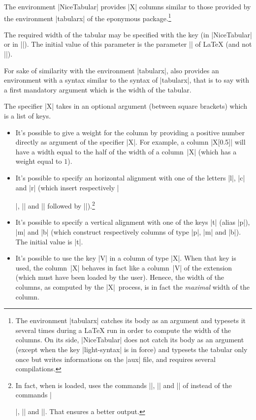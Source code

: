 \documentclass[dvipsnames]{article}
\begin{document}
\label{X-columns}

The environment |{NiceTabular}| provides |X| columns similar to those provided
by the environment |{tabularx}| of the eponymous package.\footnote{The
  environment |{tabularx}| catches its body as an argument and typesets it
  several times during a LaTeX run in order to compute the width of the columns.
  On its side, |{NiceTabular}| does not catch its body as an argument (except
  when the key |light-syntax| is in force) and typesets the tabular only once but writes
  informations on the |aux| file, and requires several compilations.}

The required width of the tabular may be specified with the key
 (in |{NiceTabular}| or in |\NiceMatrixOptions|). The initial
value of this parameter is the parameter |\linewidth| of LaTeX (and not
|\textwidth|).

For sake of similarity with the environment |{tabularx}|,  also
provides an environment  with a syntax similar to
the syntax of |{tabularx}|, that is to say with a first mandatory argument which
is the width of the tabular.

\medskip
The specifier |X| takes in an optional argument (between square brackets) which
is a list of keys.
\begin{itemize}
\item It's possible to give a weight for the column by providing a positive number
directly as argument of the specifier |X|. For example, a column |X[0.5]| will
have a width equal to the half of the width of a column~|X| (which has a weight
equal to $1$).
\item It's possible to specify an horizontal alignment with one of the
letters |l|, |c| and |r| (which insert respectively |\raggedright|,
|\centering| and |\raggedleft| followed by |\arraybackslash|).\footnote{In fact,
when  is loaded,  uses the commands
|\RaggedRight|, |\Centering| and |\RaggedLeft| of  instead of the
commands |\raggedright|, |\centering| and |\raggedleft|. That ensures a better output.}
\item It's possible to specify a vertical alignment with one of the keys
|t| (alias |p|), |m| and |b| (which construct respectively columns of type
|p|, |m| and |b|). The initial value is |t|.

\item It's possible to use the key |V| in a column of type |X|. When that key is used,
the column~|X| behaves in fact like a column~|V| of the extension 
(which must have been loaded by the user). Henece, the width of the columns, as
computed by the |X|~process, is in fact the \emph{maximal} width of the column.
\end{itemize}
\end{document}
